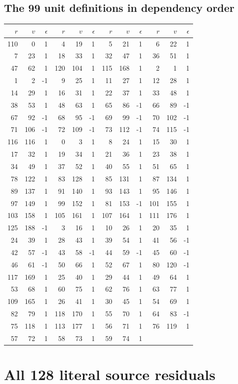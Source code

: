 \documentclass[11pt]{article}
\begin{document}
\subsection*{The 99 unit definitions in dependency order}
\begin{longtable}{rrr@{\qquad}rrr@{\qquad}rrr@{\qquad}rrr}
\toprule
$r$&$v$&$\epsilon$&$r$&$v$&$\epsilon$&$r$&$v$&$\epsilon$&$r$&$v$&$\epsilon$\\\midrule\endhead
110&0&1&4&19&1&5&21&1&6&22&1\\
7&23&1&18&33&1&32&47&1&36&51&1\\
47&62&1&120&104&1&115&168&1&2&1&1\\
1&2&-1&9&25&1&11&27&1&12&28&1\\
14&29&1&16&31&1&22&37&1&33&48&1\\
38&53&1&48&63&1&65&86&-1&66&89&-1\\
67&92&-1&68&95&-1&69&99&-1&70&102&-1\\
71&106&-1&72&109&-1&73&112&-1&74&115&-1\\
116&116&1&0&3&1&8&24&1&15&30&1\\
17&32&1&19&34&1&21&36&1&23&38&1\\
34&49&1&37&52&1&40&55&1&51&65&1\\
78&122&1&83&128&1&85&131&1&87&134&1\\
89&137&1&91&140&1&93&143&1&95&146&1\\
97&149&1&99&152&1&81&153&-1&101&155&1\\
103&158&1&105&161&1&107&164&1&111&176&1\\
125&188&-1&3&16&1&10&26&1&20&35&1\\
24&39&1&28&43&1&39&54&1&41&56&-1\\
42&57&-1&43&58&-1&44&59&-1&45&60&-1\\
46&61&-1&50&66&1&52&67&1&80&120&-1\\
117&169&1&25&40&1&29&44&1&49&64&1\\
53&68&1&60&75&1&62&76&1&63&77&1\\
109&165&1&26&41&1&30&45&1&54&69&1\\
82&79&1&118&170&1&55&70&1&64&83&-1\\
75&118&1&113&177&1&56&71&1&76&119&1\\
57&72&1&58&73&1&59&74&1&&&\\
\bottomrule\end{longtable}


\section{All 128 literal source residuals}\label{app:source}
\end{document}
